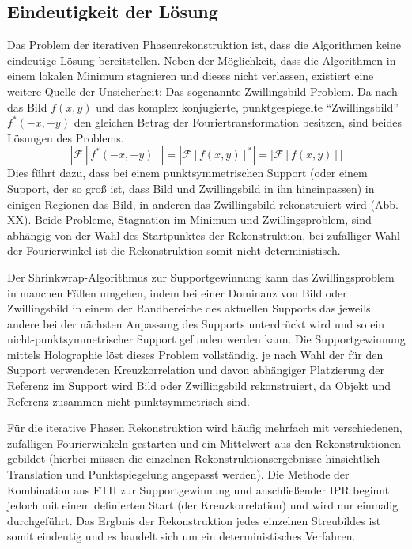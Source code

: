 \subsection{Eindeutigkeit der Lösung}
Das Problem der iterativen Phasenrekonstruktion ist, dass die Algorithmen keine eindeutige Lösung bereitstellen. Neben der Möglichkeit, dass die Algorithmen in einem lokalen Minimum stagnieren und dieses nicht verlassen, existiert eine weitere Quelle der Unsicherheit: Das sogenannte Zwillingsbild-Problem. Da nach  das Bild $f(x,y)$ und das komplex konjugierte, punktgespiegelte "`Zwillingsbild"'  $f^*(-x,-y)$ den gleichen Betrag der Fouriertransformation besitzen, sind beides Lösungen des Problems.
\begin{equation}
\label{eq:zwilling}
	\left|\mathscr{F}[f^*(-x,-y)]\right|=\left|\mathscr{F}[f(x,y)]^*\right|=\left|\mathscr{F}[f(x,y)]\right|
\end{equation}
Dies führt dazu, dass bei einem punktsymmetrischen Support (oder einem Support, der so groß ist, dass Bild und Zwillingsbild in ihn hineinpassen) in einigen Regionen das Bild, in anderen das Zwillingsbild rekonstruiert wird (Abb. XX). Beide Probleme, Stagnation im Minimum und Zwillingsproblem, sind abhängig von der Wahl des Startpunktes der Rekonstruktion, bei zufälliger Wahl der Fourierwinkel ist die Rekonstruktion somit nicht deterministisch.

Der Shrinkwrap-Algorithmus zur Supportgewinnung kann das Zwillingsproblem in manchen Fällen umgehen, indem bei einer Dominanz von Bild oder Zwillingsbild in einem der Randbereiche des aktuellen Supports das jeweils andere bei der nächsten Anpassung des Supports unterdrückt wird und so ein nicht-punktsymmetrischer Support gefunden werden kann.
Die Supportgewinnung mittels Holographie löst dieses Problem vollständig. je nach Wahl der für den Support verwendeten Kreuzkorrelation und davon abhängiger Platzierung der Referenz im Support wird Bild oder Zwillingsbild rekonstruiert, da Objekt und Referenz zusammen nicht punktsymmetrisch sind.

Für die iterative Phasen Rekonstruktion wird häufig mehrfach mit verschiedenen, zufälligen Fourierwinkeln gestarten und ein Mittelwert aus den Rekonstruktionen gebildet (hierbei müssen die einzelnen Rekonstruktionsergebnisse hinsichtlich Translation und Punktspiegelung angepasst werden). Die Methode der Kombination aus FTH zur Supportgewinnung und anschließender IPR beginnt jedoch mit einem definierten Start (der Kreuzkorrelation) und wird nur einmalig durchgeführt. Das Ergbnis der Rekonstruktion jedes einzelnen Streubildes ist somit eindeutig und es handelt sich um ein deterministisches Verfahren.

